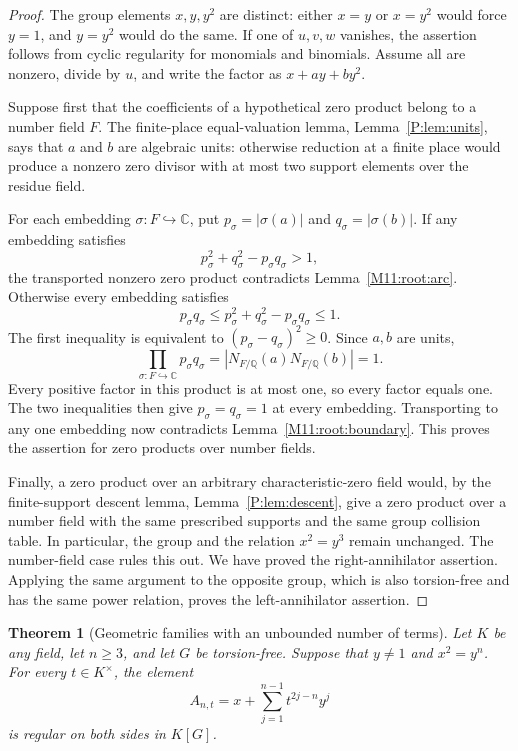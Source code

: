 \documentclass[11pt,a4paper,oneside]{report}
\newtheorem{theorem}{Theorem}[section]
\theoremstyle{definition}
\theoremstyle{remark}
\newcommand{\C}{\mathbb C}
\newcommand{\Q}{\mathbb Q}
\begin{document}
\begin{proof}
The group elements $x,y,y^2$ are distinct: either $x=y$ or $x=y^2$
would force $y=1$, and $y=y^2$ would do the same.
If one of $u,v,w$ vanishes, the assertion follows from cyclic
regularity for monomials and binomials.  Assume all are nonzero,
divide by $u$, and write the factor as $x+ay+by^2$.

Suppose first that the coefficients of a hypothetical zero product
belong to a number field $F$.  The finite-place equal-valuation
lemma, Lemma~\ref{P:lem:units}, says that $a$ and $b$ are algebraic
units: otherwise reduction at a finite place would produce a
nonzero zero divisor with at most two support elements over the
residue field.

For each embedding $\sigma:F\hookrightarrow\C$, put
$p_\sigma=|\sigma(a)|$ and $q_\sigma=|\sigma(b)|$.
If any embedding satisfies
\[
 p_\sigma^2+q_\sigma^2-p_\sigma q_\sigma>1,
\]
the transported nonzero zero product contradicts
Lemma~\ref{M11:root:arc}.  Otherwise every embedding satisfies
\[
 p_\sigma q_\sigma
 \le p_\sigma^2+q_\sigma^2-p_\sigma q_\sigma
 \le1.
\]
The first inequality is equivalent to
$(p_\sigma-q_\sigma)^2\ge0$.  Since $a,b$ are units,
\[
 \prod_{\sigma:F\hookrightarrow\C}
       p_\sigma q_\sigma
    =|N_{F/\Q}(a)N_{F/\Q}(b)|=1.
\]
Every positive factor in this product is at most one, so every
factor equals one.  The two inequalities then give
$p_\sigma=q_\sigma=1$ at every embedding.  Transporting to any
one embedding now contradicts Lemma~\ref{M11:root:boundary}.
This proves the assertion for zero products over number fields.

Finally, a zero product over an arbitrary characteristic-zero field
would, by the finite-support descent lemma,
Lemma~\ref{P:lem:descent}, give a zero product over a number field
with the same prescribed supports and the same group collision
table.  In particular, the group and the relation $x^2=y^3$ remain
unchanged.  The number-field case rules this out.  We have proved
the right-annihilator assertion.  Applying the same argument to
the opposite group, which is also torsion-free and has the same
power relation, proves the left-annihilator assertion.
\end{proof}

\begin{theorem}[Geometric families with an unbounded number of terms]
\label{M11:root:geometric}
Let $K$ be any field, let $n\ge3$, and let $G$ be torsion-free.
Suppose that $y\ne1$ and $x^2=y^n$.  For every $t\in K^\times$,
the element
\[
 A_{n,t}=x+\sum_{j=1}^{n-1}t^{2j-n}y^j
\]
is regular on both sides in $K[G]$.
\end{theorem}
\end{document}
